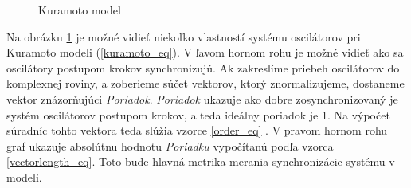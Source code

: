 \documentclass[a4paper, 11pt]{article}
\begin{document}
\begin{figure}[h]
    \hspace*{-0.8cm}
\caption{Kuramoto model\label{obr1}}
\end{figure}




Na obrázku \ref{obr1} je možné vidieť niekoľko vlastností systému oscilátorov pri Kuramoto modeli (\ref{kuramoto_eq}). V ľavom hornom rohu je možné vidieť ako sa oscilátory postupom krokov synchronizujú. Ak zakreslíme priebeh oscilátorov do komplexnej roviny, a zoberieme súčet vektorov, ktorý znormalizujeme, dostaneme vektor znázorňujúci \textit{Poriadok}. \textit{Poriadok} ukazuje ako dobre zosynchronizovaný je systém oscilátorov postupom krokov, a teda ideálny poriadok je 1. Na výpočet súradníc tohto vektora teda slúžia vzorce \ref{order_eq} \cite{KuramotoCycle}. V pravom hornom rohu graf ukazuje absolútnu hodnotu \textit{Poriadku} vypočítanú podľa vzorca \ref{vectorlength_eq}. Toto bude hlavná metrika merania synchronizácie systému v modeli.
\end{document}
